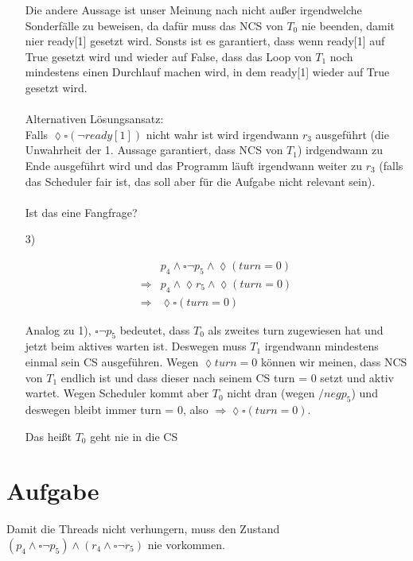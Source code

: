 \begin{itemize}
Die andere Aussage ist unser Meinung nach nicht außer irgendwelche Sonderfälle zu beweisen, da dafür muss das NCS von $T_0$ nie beenden, damit nier ready[1] gesetzt wird. Sonsts ist es garantiert, dass wenn ready[1] auf True gesetzt wird und wieder auf False, dass das Loop von $T_1$ noch mindestens einen Durchlauf machen wird, in dem ready[1] wieder auf True gesetzt wird. \\ \\

Alternativen Lösungsansatz: \\
Falls $\lozenge \square (\neg ready[1])$ nicht wahr ist wird irgendwann $r_3$ ausgeführt (die Unwahrheit der 1. Aussage garantiert, dass NCS von $T_1$) irdgendwann zu Ende ausgeführt wird und das Programm läuft irgendwann weiter zu $r_3$ (falls das Scheduler fair ist, das soll aber für die Aufgabe nicht relevant sein). \\ \\

Ist das eine Fangfrage?

\item[3)]

\begin{align}
	& p_4 \land \square \neg p_5 \land \lozenge (turn = 0) \\
	\Rightarrow & p_4 \land \lozenge r_5 \land \lozenge (turn = 0) \\
	\Rightarrow & \lozenge \square (turn = 0)
\end{align}

Analog zu 1), $ \square \neg p_5$ bedeutet, dass $T_0$ als zweites turn zugewiesen hat und jetzt beim aktives warten ist. Deswegen muss $T_1$ irgendwann mindestens einmal sein CS ausgeführen. Wegen $\lozenge turn  = 0$ können wir meinen, dass NCS von $T_1$ endlich ist und dass dieser nach seinem CS turn = 0 setzt und aktiv wartet. Wegen Scheduler kommt aber $T_0$ nicht dran (wegen $/neg p_5$) und deswegen bleibt immer turn = 0, also $\Rightarrow \lozenge \square (turn = 0)$.


Das heißt $T_0$ geht nie in die CS 

\end{itemize}

\section{Aufgabe}

Damit die Threads nicht verhungern, muss den Zustand $(p_4 \land \square \neg p_5) \land (r_4 \land \square \neg r_5)$ nie vorkommen. \\ \\

